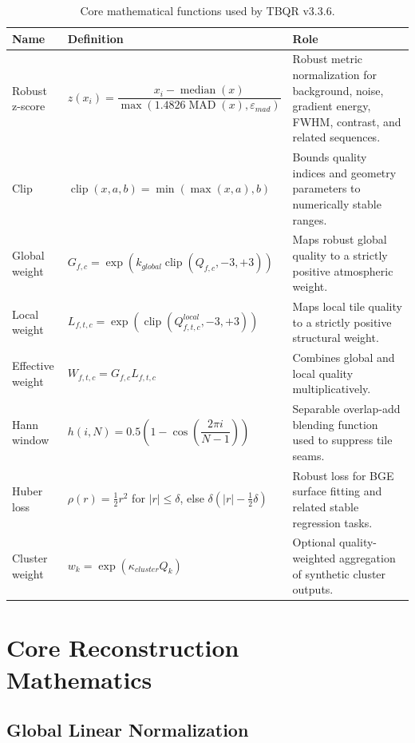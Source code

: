 \documentclass[10pt,twocolumn]{article}
\begin{document}
\begin{table}[t]
\centering
\caption{Core mathematical functions used by TBQR v3.3.6.}
\begin{tabularx}{\textwidth}{>{\raggedright\arraybackslash}p{} >{\raggedright\arraybackslash}p{} X}
\toprule
\textbf{Name} & \textbf{Definition} & \textbf{Role} \\
\midrule
Robust z-score &
$z(x_i)=\dfrac{x_i-\operatorname{median}(x)}{\max(1.4826\operatorname{MAD}(x),\varepsilon_{mad})}$ &
Robust metric normalization for background, noise, gradient energy, FWHM, contrast, and related sequences. \\
\addlinespace
Clip &
$\operatorname{clip}(x,a,b)=\min(\max(x,a),b)$ &
Bounds quality indices and geometry parameters to numerically stable ranges. \\
\addlinespace
Global weight &
$G_{f,c}=\exp(k_{global}\operatorname{clip}(Q_{f,c},-3,+3))$ &
Maps robust global quality to a strictly positive atmospheric weight. \\
\addlinespace
Local weight &
$L_{f,t,c}=\exp(\operatorname{clip}(Q_{f,t,c}^{local},-3,+3))$ &
Maps local tile quality to a strictly positive structural weight. \\
\addlinespace
Effective weight &
$W_{f,t,c}=G_{f,c}L_{f,t,c}$ &
Combines global and local quality multiplicatively. \\
\addlinespace
Hann window &
$h(i,N)=0.5\!\left(1-\cos\!\left(\dfrac{2\pi i}{N-1}\right)\right)$ &
Separable overlap-add blending function used to suppress tile seams. \\
\addlinespace
Huber loss &
$\rho(r)=\frac{1}{2}r^2$ for $|r|\le \delta$, else $\delta(|r|-\frac{1}{2}\delta)$ &
Robust loss for BGE surface fitting and related stable regression tasks. \\
\addlinespace
Cluster weight &
$w_k=\exp(\kappa_{cluster}Q_k)$ &
Optional quality-weighted aggregation of synthetic cluster outputs. \\
\bottomrule
\end{tabularx}
\label{tab:functions}
\end{table}

\section{Core Reconstruction \protect \\Mathematics}

\subsection{Global Linear Normalization}
\end{document}
